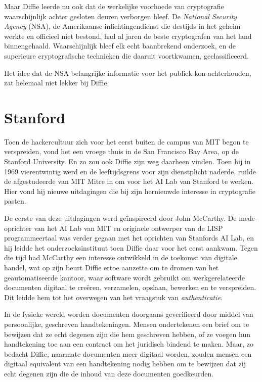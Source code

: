 \documentclass[
  a5paper,
  smalldemyvopaper,11pt,twoside,onecolumn,openright,extrafontsizes,
hidelinks]{memoir}
\begin{document}
Maar Diffie leerde nu ook dat de werkelijke voorhoede van cryptografie
waarschijnlijk achter gesloten deuren verborgen bleef. De \emph{National
Security Agency} (NSA), de Amerikaanse inlichtingendienst die destijds
in het geheim werkte en officieel niet bestond, had al jaren de beste
cryptografen van het land binnengehaald. Waarschijnlijk bleef elk echt
baanbrekend onderzoek, en de superieure cryptografische technieken die
daaruit voortkwamen, geclassificeerd.

Het idee dat de NSA belangrijke informatie voor het publiek kon
achterhouden, zat helemaal niet lekker bij Diffie.

\section{Stanford}\label{stanford}

Toen de hackercultuur zich voor het eerst buiten de campus van MIT begon
te verspreiden, vond het een vroege thuis in de San Francisco Bay Area,
op de Stanford University. En zo zou ook Diffie zijn weg daarheen
vinden. Toen hij in 1969 vierentwintig werd en de leeftijdsgrens voor
zijn dienstplicht naderde, ruilde de afgestudeerde van MIT Mitre in om
voor het AI Lab van Stanford te werken. Hier vond hij nieuwe uitdagingen
die bij zijn hernieuwde interesse in cryptografie pasten.

De eerste van deze uitdagingen werd geïnspireerd door John McCarthy. De
mede-oprichter van het AI Lab van MIT en originele ontwerper van de LISP
programmeertaal was verder gegaan met het oprichten van Stanfords AI
Lab, en hij leidde het onderzoeksinstituut toen Diffie daar voor het
eerst aankwam. Tegen die tijd had McCarthy een interesse ontwikkeld in
de toekomst van digitale handel, wat op zijn beurt Diffie ertoe aanzette
om te dromen van het geautomatiseerde kantoor, waar software wordt
gebruikt om werkgerelateerde documenten digitaal te creëren, verzamelen,
opslaan, bewerken en te verspreiden. Dit leidde hem tot het overwegen
van het vraagstuk van \emph{authenticatie}.

In de fysieke wereld worden documenten doorgaans geverifieerd door
middel van persoonlijke, geschreven handtekeningen. Mensen ondertekenen
een brief om te bewijzen dat ze echt degenen zijn die hem geschreven
hebben, of ze voegen hun handtekening toe aan een contract om het
juridisch bindend te maken. Maar, zo bedacht Diffie, naarmate documenten
meer digitaal worden, zouden mensen een digitaal equivalent van een
handtekening nodig hebben om te bewijzen dat zij echt degenen zijn die
de inhoud van deze documenten goedkeurden.
\end{document}
